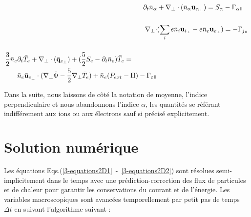 \begin{refsection}
\begin{align}
\label{3-equations2D1}
\partial_t \bar{n}_\alpha& +
\nabla_\perp\cdot\left(\bar{n}_\alpha\bar{\mathbf{u}}_{\alpha_\perp}\right)=S_\alpha
- \Gamma_{\alpha\para}\\[0.5cm]
\nabla_\perp\cdot&(\sum_ie\bar{n}_i\bar{\mathbf{u}}_{i_\perp}
-e\bar{n}_e\bar{\mathbf{u}}_{e_\perp})= - \Gamma_{j_\para}\\[0.5cm]
\begin{split}\frac{3}{2}\bar{n}_e&\partial_t\bar{T}_e +
\nabla_\perp\cdot(\bar{\mathbf{q}}_{e_\perp}) +
(\frac{5}{2}S_e-\partial_t\bar{n}_e)\bar{T}_e =\\
&\bar{n}_e\bar{\mathbf{u}}_{e_\perp}\cdot(\nabla_\perp
\bar{\Phi}-\frac{5}{2}\nabla_\perp
\bar{T}_e)+\bar{n}_e(P_{ext}-\Pi)-\Gamma_{\varepsilon\para}
\label{3-equations2D2}
\end{split}
\end{align}

Dans la suite, nous laissons de côté la notation de moyenne, l'indice
perpendiculaire et nous abandonnons l'indice $\alpha$, les quantités se référant
indifférement aux ions ou aux électrons sauf si précisé explicitement.

\section{Solution numérique}

Les équations Eqs.(\ref{3-equations2D1}~-~\ref{3-equations2D2}) sont résolues
semi-implicitement dans le temps avec une prédiction-correction des flux de
particules et de chaleur pour garantir les conservations du courant et de
l'énergie. Les variables macroscopiques sont avancées temporellement par
petit pas de temps $\Delta t$ en suivant l'algorithme suivant :


\end{refsection}
